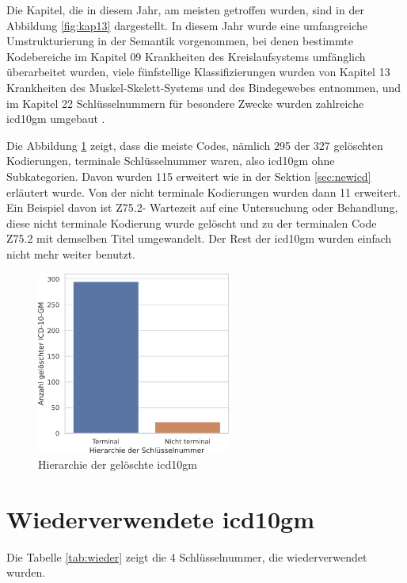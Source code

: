 Die Kapitel, die in diesem Jahr, am meisten getroffen wurden, sind in der Abbildung \ref{fig:kap13} dargestellt. In diesem Jahr wurde eine umfangreiche Umstrukturierung in der Semantik vorgenommen, bei denen bestimmte Kodebereiche im Kapitel \textsf{09} \textsf{Krankheiten des Kreislaufsystems} umfänglich überarbeitet wurden, viele fünfstellige Klassifizierungen wurden von Kapitel \textsf{13} \textsf{Krankheiten des Muskel-Skelett-Systems und des Bindegewebes} entnommen, und im Kapitel \textsf{22} \textsf{Schlüsselnummern für besondere Zwecke} wurden zahlreiche \ac{icd10gm} umgebaut \cite{dele13}.

Die Abbildung \ref{fig:oldicdort} zeigt, dass die meiste Codes, nämlich \textsf{295} der \textsf{327} gelöschten Kodierungen, terminale Schlüsselnummer waren, also \ac{icd10gm} ohne Subkategorien. Davon wurden \textsf{115} erweitert wie in der Sektion \ref{sec:newicd} erläutert wurde. Von der nicht terminale Kodierungen wurden dann \textsf{11} erweitert. Ein Beispiel davon ist \textsf{Z75.2-} \textsf{Wartezeit auf eine Untersuchung oder Behandlung}, diese nicht terminale Kodierung wurde gelöscht und zu der terminalen Code \textsf{Z75.2} mit demselben Titel umgewandelt. Der Rest der \ac{icd10gm} wurden einfach nicht mehr weiter benutzt. 


\begin{figure}[ht]
	\centering
	\includegraphics[height=6cm]{figures/ortoldYear}
	\caption{Hierarchie der gelöschte \acs{icd10gm}}
	\label{fig:oldicdort}
\end{figure}


\section{Wiederverwendete \acs{icd10gm}} \label{sec:delinicd}

Die Tabelle \ref{tab:wieder} zeigt die \textsf{4} Schlüsselnummer, die wiederverwendet wurden.

